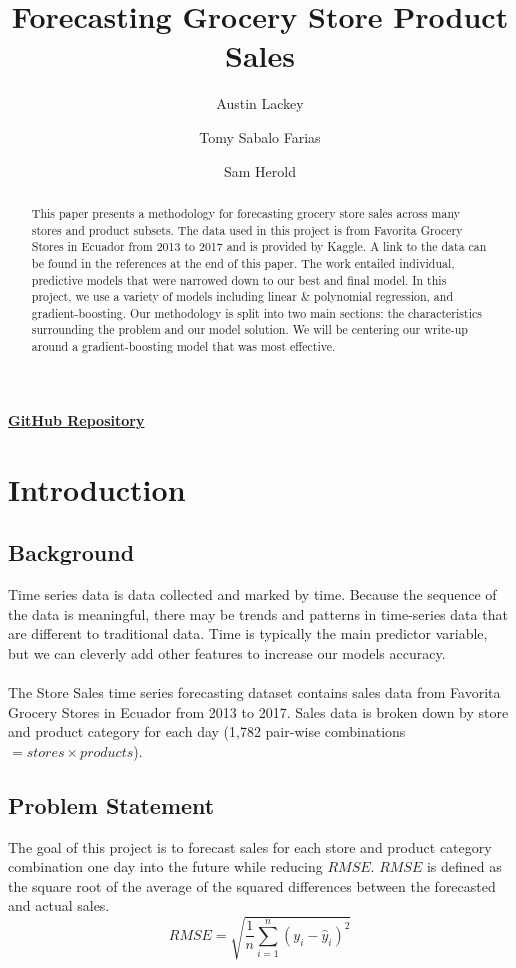 \documentclass[12pt]{article}
\title{Forecasting Grocery Store Product Sales}
\author{Austin Lackey}
\author{Tomy Sabalo Farias}
\author{Sam Herold}
\affil{DSCI 478, Colorado State University}
\begin{document}
\maketitle
\begin{center}
    \href{https://github.com/austinlackey/store-sales-forecasting}{\textbf{GitHub Repository}}
\end{center}

\begin{abstract}
This paper presents a methodology for forecasting grocery store sales across many stores and product subsets.
The data used in this project is from Favorita Grocery Stores in Ecuador from 2013 to 2017 and is provided by Kaggle.
A link to the data can be found in the references at the end of this paper. The work entailed individual, predictive models that were narrowed down to our best and final model.
In this project, we use a variety of models including linear \& polynomial regression, and gradient-boosting. 
Our methodology is split into two main sections: the characteristics surrounding the problem and our model solution. We will be centering our write-up around a gradient-boosting model that was most effective.
\end{abstract}

\section{Introduction}
\subsection{Background}
Time series data is data collected and marked by time. 
Because the sequence of the data is meaningful, there may be trends and patterns in time-series data that are different to traditional data.
Time is typically the main predictor variable, but we can cleverly add other features to increase our models accuracy\cite{timeseries}.
\\
\\
The Store Sales time series forecasting dataset contains sales data from Favorita Grocery Stores in Ecuador from 2013 to 2017\cite{kaggle}.
Sales data is broken down by store and product category for each day (1,782 pair-wise combinations $=stores \times products$).
\subsection{Problem Statement}
The goal of this project is to forecast sales for each store and product category combination one day into the future while reducing $RMSE$.
$RMSE$ is defined as the square root of the average of the squared differences between the forecasted and actual sales.
\[ RMSE = \sqrt{\frac{1}{n}\sum_{i=1}^{n}(y_i - \hat{y}_i)^2} \]
\end{document}
